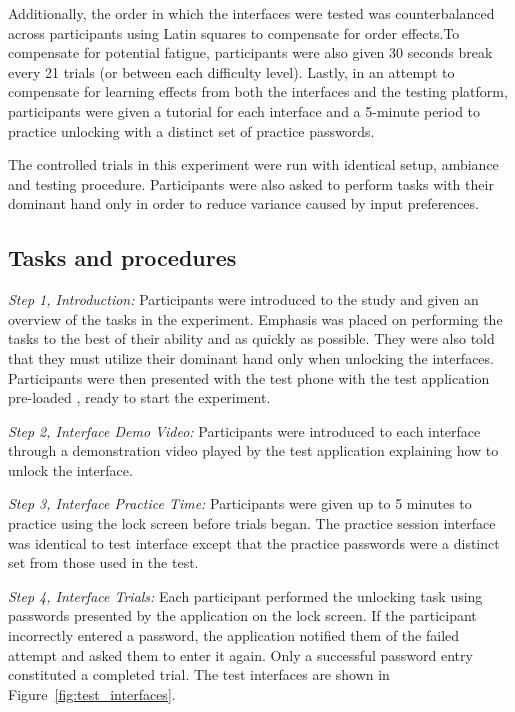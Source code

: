 \documentclass{sigchi}
\begin{document}
Additionally, the order in which the interfaces were tested was counterbalanced across participants using Latin squares to compensate for order effects.To compensate for potential fatigue, participants were also given 30 seconds break every 21 trials (or between each difficulty level). Lastly, in an attempt to compensate for learning effects from both the interfaces and the testing platform, participants were given a tutorial for each interface and a 5-minute period to practice unlocking with a distinct set of practice passwords. 

The controlled trials in this experiment were run with identical setup, ambiance and testing procedure. Participants were also asked to perform tasks with their dominant hand only in order to reduce variance caused by input preferences.

\subsection{Tasks and procedures}
\textit{Step 1, Introduction: }
Participants were introduced to the study and given an overview of the tasks in the experiment. Emphasis was placed on performing the tasks to the best of their ability and as quickly as possible. They were also told that they must utilize their dominant hand only when unlocking the interfaces. Participants were then presented with the test phone with the test application pre-loaded , ready to start the experiment.

\textit{Step 2, Interface Demo Video: }
Participants were introduced to each interface through a demonstration video played by the test application explaining how to unlock the interface. 

\textit{Step 3, Interface Practice Time: }
Participants were given up to 5 minutes to practice using the lock screen before trials began. The practice session interface was identical to test interface except that the practice passwords were a distinct set from those used in the test. 
 
\textit{Step 4, Interface Trials: } 
Each participant performed the unlocking task using passwords presented by the application on the lock screen. If the participant incorrectly entered a password, the application notified them of the failed attempt and asked them to enter it again. Only a successful password entry constituted a completed trial. The test interfaces are shown in Figure~\ref{fig:test_interfaces}.
\end{document}
